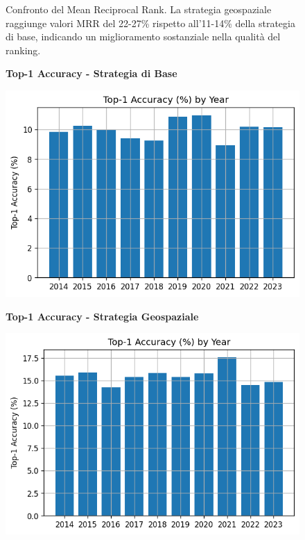 \begin{itemize}
\begin{figure}[htbp]
\begin{minipage}{0.48\textwidth}
\end{minipage}
\caption{Confronto del Mean Reciprocal Rank. La strategia geospaziale raggiunge valori MRR del 22-27\% rispetto all'11-14\% della strategia di base, indicando un miglioramento sostanziale nella qualità del ranking.}
\label{fig:mrr_comparison}
\end{figure}

\begin{figure}[htbp]
\centering
\begin{minipage}{0.48\textwidth}
\centering
\textbf{Top-1 Accuracy - Strategia di Base}\par
\vspace{0.3em}
\includegraphics[width=\textwidth]{../../img/llama3.1_8b/no_SPACE-GEO_n-1_come_current_POI/top1_accuracy.png}
\end{minipage}
\hfill
\begin{minipage}{0.48\textwidth}
\centering
\textbf{Top-1 Accuracy - Strategia Geospaziale}\par
\vspace{0.3em}
\includegraphics[width=\textwidth]{../../img/llama3.1_8b/SPACE-GEO_n-1_come_current_POI/top_1_accuracy.png}

\end{minipage}
\end{figure}
\end{itemize}
